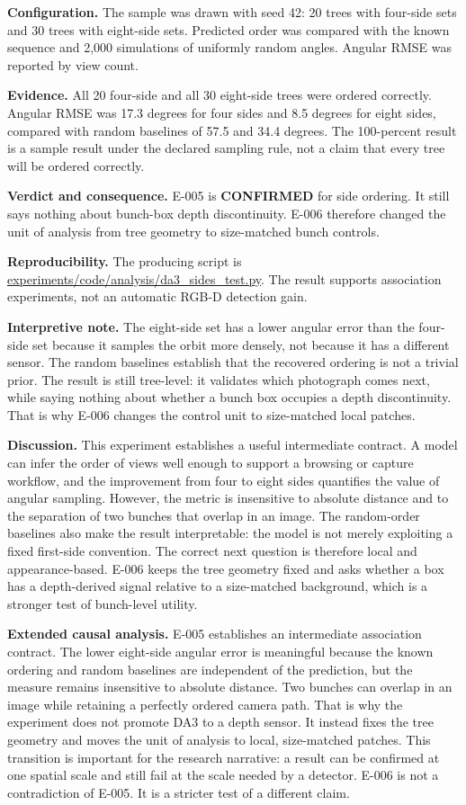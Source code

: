 \documentclass[preprint,12pt]{elsarticle}
\newcommand{\pathcode}[1]{\scriptsize\url{#1}}
\begin{document}
\textbf{Configuration.} The sample was drawn with seed 42: 20 trees with
four-side sets and 30 trees with eight-side sets. Predicted order was compared
with the known sequence and 2,000 simulations of uniformly random angles.
Angular RMSE was reported by view count.

\textbf{Evidence.} All 20 four-side and all 30 eight-side trees were ordered
correctly. Angular RMSE was 17.3 degrees for four sides and 8.5 degrees for
eight sides, compared with random baselines of 57.5 and 34.4 degrees. The
100-percent result is a sample result under the declared sampling rule, not a
claim that every tree will be ordered correctly.

\textbf{Verdict and consequence.} E-005 is \textbf{CONFIRMED} for side
ordering. It still says nothing about bunch-box depth discontinuity. E-006
therefore changed the unit of analysis from tree geometry to size-matched
bunch controls.

\textbf{Reproducibility.} The producing script is
\pathcode{experiments/code/analysis/da3_sides_test.py}. The result
supports association experiments, not an automatic RGB-D detection gain.

\textbf{Interpretive note.} The eight-side set has a lower angular error than
the four-side set because it samples the orbit more densely, not because it
has a different sensor. The random baselines establish that the recovered
ordering is not a trivial prior. The result is still tree-level: it validates
which photograph comes next, while saying nothing about whether a bunch box
occupies a depth discontinuity. That is why E-006 changes the control unit to
size-matched local patches.

\textbf{Discussion.} This experiment establishes a useful intermediate
contract. A model can infer the order of views well enough to support a
browsing or capture workflow, and the improvement from four to eight sides
quantifies the value of angular sampling. However, the metric is insensitive
to absolute distance and to the separation of two bunches that overlap in an
image. The random-order baselines also make the result interpretable: the
model is not merely exploiting a fixed first-side convention. The correct next
question is therefore local and appearance-based. E-006 keeps the tree
geometry fixed and asks whether a box has a depth-derived signal relative to
a size-matched background, which is a stronger test of bunch-level utility.

\textbf{Extended causal analysis.} E-005 establishes an intermediate
association contract. The lower eight-side angular error is meaningful because
the known ordering and random baselines are independent of the prediction,
but the measure remains insensitive to absolute distance. Two bunches can
overlap in an image while retaining a perfectly ordered camera path. That is
why the experiment does not promote DA3 to a depth sensor. It instead fixes
the tree geometry and moves the unit of analysis to local, size-matched
patches. This transition is important for the research narrative: a result
can be confirmed at one spatial scale and still fail at the scale needed by a
detector. E-006 is not a contradiction of E-005. It is a stricter test of a
different claim.
\end{document}
